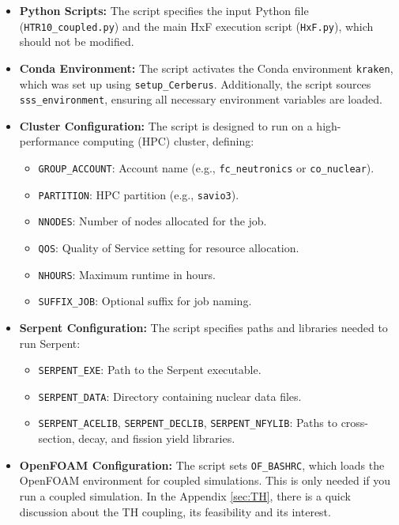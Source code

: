 \documentclass{article}
\begin{document}
\begin{itemize}
    \item \textbf{Python Scripts:}  
    The script specifies the input Python file (\texttt{HTR10\_coupled.py}) and the main HxF execution script (\texttt{HxF.py}), which should not be modified.

    \item \textbf{Conda Environment:}  
    The script activates the Conda environment \texttt{kraken}, which was set up using \texttt{setup\_Cerberus}. Additionally, the script sources \texttt{sss\_environment}, ensuring all necessary environment variables are loaded.

    \item \textbf{Cluster Configuration:}  
    The script is designed to run on a high-performance computing (HPC) cluster, defining:
    \begin{itemize}
        \item \texttt{GROUP\_ACCOUNT}: Account name (e.g., \texttt{fc\_neutronics} or \texttt{co\_nuclear}).
        \item \texttt{PARTITION}: HPC partition (e.g., \texttt{savio3}).
        \item \texttt{NNODES}: Number of nodes allocated for the job.
        \item \texttt{QOS}: Quality of Service setting for resource allocation.
        \item \texttt{NHOURS}: Maximum runtime in hours.
        \item \texttt{SUFFIX\_JOB}: Optional suffix for job naming.
    \end{itemize}

    \item \textbf{Serpent Configuration:}  
    The script specifies paths and libraries needed to run Serpent:
    \begin{itemize}
        \item \texttt{SERPENT\_EXE}: Path to the Serpent executable.
        \item \texttt{SERPENT\_DATA}: Directory containing nuclear data files.
        \item \texttt{SERPENT\_ACELIB}, \texttt{SERPENT\_DECLIB}, \texttt{SERPENT\_NFYLIB}: Paths to cross-section, decay, and fission yield libraries.
    \end{itemize}

    \item \textbf{OpenFOAM Configuration:}  
    The script sets \texttt{OF\_BASHRC}, which loads the OpenFOAM environment for coupled simulations. This is only needed if you run a coupled simulation. In the Appendix \ref{sec:TH}, there is a quick discussion about the TH coupling, its feasibility and its interest.
\end{itemize}
\end{document}
